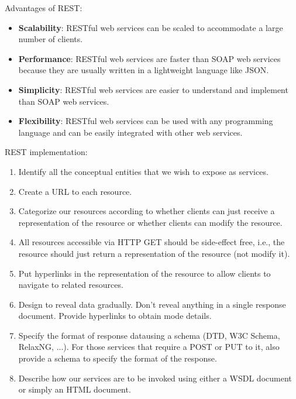 Advantages of REST:
\begin{itemize}
    \item \textbf{Scalability}: RESTful web services can be scaled to accommodate a large number of clients.
    \item \textbf{Performance}: RESTful web services are faster than SOAP web services because they are usually written in a lightweight language like JSON.
    \item \textbf{Simplicity}: RESTful web services are easier to understand and implement than SOAP web services.
    \item \textbf{Flexibility}: RESTful web services can be used with any programming language and can be easily integrated with other web services.
\end{itemize}

REST implementation:
\begin{enumerate}
    \item Identify all the conceptual entities that we wish to expose as services. 
    \item Create a URL to each resource.
    \item Categorize our resources according to whether clients can just receive a representation of the resource or whether clients can modify the resource.
    \item All resources accessible via HTTP GET should be side-effect free, i.e., the resource should just return a representation of the resource (not modify it).
    \item Put hyperlinks in the representation of the resource to allow clients to navigate to related resources.
    \item Design to reveal data gradually. Don't reveal anything in a single response document. Provide hyperlinks to obtain mode details. 
    \item Specify the format of response datausing a schema (DTD, W3C Schema, RelaxNG, ...). For those services that require a POST or PUT to it, also provide a schema to specify the format of the response. 
    \item Describe how our services are to be invoked using either a WSDL document or simply an HTML document. 
\end{enumerate}